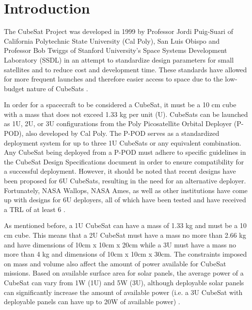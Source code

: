 \documentclass[11pt]{article}
\begin{document}
\maketitle

\begin{abstract}
...............
\end{abstract}

\section{Introduction}
The CubeSat Project was developed in 1999 by Professor Jordi Puig-Suari of California Polytechnic State University (Cal Poly), San Luis Obispo and Professor Bob Twiggs of Stanford University's Space Systems Development Laboratory (SSDL) in an attempt to standardize design parameters for small satellites and to reduce cost and development time.  These standards have allowed for more frequent launches and therefore easier access to space due to the low-budget nature of CubeSats \cite{CalPoly}.

In order for a spacecraft to be considered a CubeSat, it must be a 10 cm cube with a mass that does not exceed 1.33 kg per unit (U).  CubeSats can be launched as 1U, 2U, or 3U configurations from the Poly Picosatellite Orbital Deployer (P-POD), also developed by Cal Poly.  The P-POD serves as a standardized deployment system for up to three 1U CubeSats or any equivalent combination.  Any CubeSat being deployed from a P-POD must adhere to specific guidelines in the CubeSat Design Specifications document in order to ensure compatibility for a successful deployment.  However, it should be noted that recent designs have been proposed for 6U CubeSats, resulting in the need for an alternative deployer.  Fortunately, NASA Wallops, NASA Ames, as well as other institutions have come up with designs for 6U deployers, all of which have been tested and have received a TRL of at least 6 \cite{SmSCTech}.

As mentioned before, a 1U CubeSat can have a mass of 1.33 kg and must be a 10 cm cube.  This means that a 2U CubeSat must have a mass no more than 2.66 kg and have dimensions of 10cm x 10cm x 20cm while a 3U must have a mass no more than 4 kg and dimensions of 10cm x 10cm x 30cm.  The constraints imposed on mass and volume also affect the amount of power available for CubeSat missions.  Based on available surface area for solar panels, the average power of a CubeSat can vary from 1W (1U) and 5W (3U), although deployable solar panels can significantly increase the amount of available power (i.e. a 3U CubeSat with deployable panels can have up to 20W of available power) \cite{ClydeSpace}. 
\end{document}
